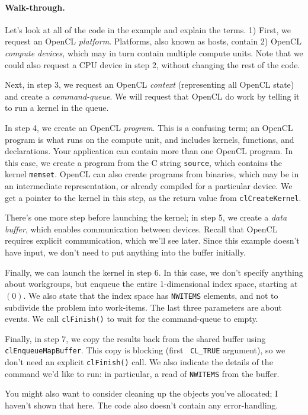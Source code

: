 \documentclass[a4paper]{report}
\begin{document}
\paragraph{Walk-through.} Let's look at all of the code in the example and
explain the terms. 1) First, we request an OpenCL \emph{platform}.
Platforms, also known as hosts, contain 2) OpenCL \emph{compute devices},
which may in turn contain multiple compute units. Note that we could
also request a CPU device in step 2, without changing the rest of the code.

Next, in step 3, we request an OpenCL \emph{context} (representing all
OpenCL state) and create a \emph{command-queue}. We will request that
OpenCL do work by telling it to run a kernel in the queue.

In step 4, we create an OpenCL \emph{program}. This is a confusing
term; an OpenCL program is what runs on the compute unit, and includes
kernels, functions, and declarations. Your application can contain
more than one OpenCL program. In this case, we create a program
from the C string {\tt source}, which contains the kernel
{\tt memset}. OpenCL can also create programs from binaries, which may be
in an intermediate representation, or already compiled for a particular
device. We get a pointer to the kernel in this step, as the return
value from {\tt clCreateKernel}.

There's one more step before launching the kernel; in step 5, we
create a \emph{data buffer}, which enables communication between
devices. Recall that OpenCL requires explicit communication,
which we'll see later. Since this example doesn't have input, we 
don't need to put anything into the buffer initially.

Finally, we can launch the kernel in step 6. In this case, we don't
specify anything about workgroups, but enqueue the entire
1-dimensional index space, starting at $(0)$. We also state that the
index space has {\tt NWITEMS} elements, and not to subdivide the
problem into work-items. The last three parameters are about events.
We call {\tt clFinish()} to wait for the command-queue to empty.

Finally, in step 7, we copy the results back from the shared buffer
using {\tt clEnqueueMapBuffer}. This copy is blocking (first {\tt
  CL\_TRUE} argument), so we don't need an explicit {\tt clFinish()}
call. We also indicate the details of the command we'd like to
run: in particular, a read of {\tt NWITEMS} from the buffer.

You might also want to consider cleaning up the objects you've
allocated; I haven't shown that here. The code also doesn't contain
any error-handling.
\end{document}
